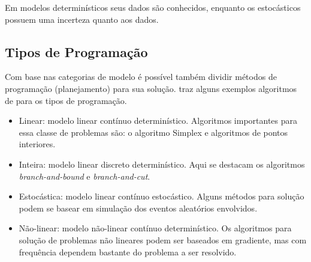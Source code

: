Em modelos determinísticos seus dados são conhecidos, enquanto os estocásticos possuem uma
incerteza quanto aos dados.

\subsection{Tipos de Programação}\label{subsec:tipos-de-programacao}

Com base nas categorias de modelo é possível também dividir métodos de programação (planejamento)
para sua solução.
 traz alguns exemplos algoritmos de para os tipos
de programação.

\begin{itemize}
    \item Linear: modelo linear contínuo determinístico.
    Algoritmos importantes para essa classe de problemas são: o algoritmo Simplex
    e algoritmos de pontos interiores.
    \item Inteira: modelo linear discreto determinístico.
    Aqui se destacam os algoritmos \textit{branch-and-bound} e \textit{branch-and-cut}.
    \item Estocástica: modelo linear contínuo estocástico.
    Alguns métodos para solução podem se basear em simulação dos eventos aleatórios envolvidos.
    \item Não-linear: modelo não-linear contínuo determinístico.
    Os algoritmos para solução de problemas não lineares podem ser baseados em gradiente,
    mas com frequência dependem bastante do problema a ser resolvido.
\end{itemize}
